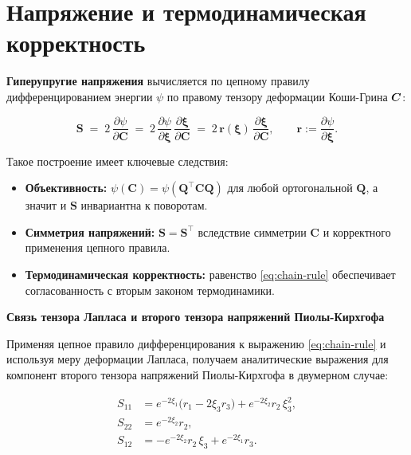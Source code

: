 \section{Напряжение и термодинамическая корректность}
\textbf{Гиперупругие напряжения} вычисляется по цепному правилу дифференцированием энергии \(\psi\) 
по правому тензору деформации Коши-Грина \(\boldsymbol{C}\):

\begin{equation}
  \mathbf{S} \;=\; 2\,\frac{\partial \psi}{\partial \mathbf{C}}
  \;=\; 2\,\frac{\partial \psi}{\partial \boldsymbol\xi}\,\frac{\partial \boldsymbol\xi}{\partial \mathbf{C}}
  \;=\; 2\,\mathbf{r}(\boldsymbol\xi)\,\frac{\partial \boldsymbol\xi}{\partial \mathbf{C}},
  \qquad \mathbf{r}:=\frac{\partial \psi}{\partial \boldsymbol\xi}.
  \label{eq:chain-rule}
\end{equation}

Такое построение имеет ключевые следствия:
\begin{itemize}
  \item \textbf{Объективность:} $\psi(\mathbf{C})=\psi(\mathbf{Q}^\top\mathbf{C}\mathbf{Q})$ для любой ортогональной $\mathbf{Q}$, а значит и $\mathbf{S}$ инвариантна к поворотам.
  \item \textbf{Симметрия напряжений:} $\mathbf{S}=\mathbf{S}^\top$ вследствие симметрии $\mathbf{C}$ и корректного применения цепного правила.
  \item \textbf{Термодинамическая корректность:} равенство \eqref{eq:chain-rule} 
обеспечивает согласованность с вторым законом термодинамики.
\end{itemize}




\textbf{Связь тензора Лапласа и второго тензора напряжений Пиолы-Кирхгофа}

Применяя цепное правило дифференцирования к выражению \eqref{eq:chain-rule} и используя меру деформации Лапласа, 
получаем аналитические выражения для компонент второго тензора напряжений Пиолы-Кирхгофа в двумерном случае:

\begin{equation}
\begin{aligned}
  S_{11} &= e^{-2\xi_1}\big(r_1-2\xi_3 r_3\big) + e^{-2\xi_2} r_2\,\xi_3^2,\\
  S_{22} &= e^{-2\xi_2} r_2,\\
  S_{12} &= -e^{-2\xi_2} r_2\,\xi_3 + e^{-2\xi_1} r_3.
\end{aligned}
\label{eq:stress_components_2d}
\end{equation}

